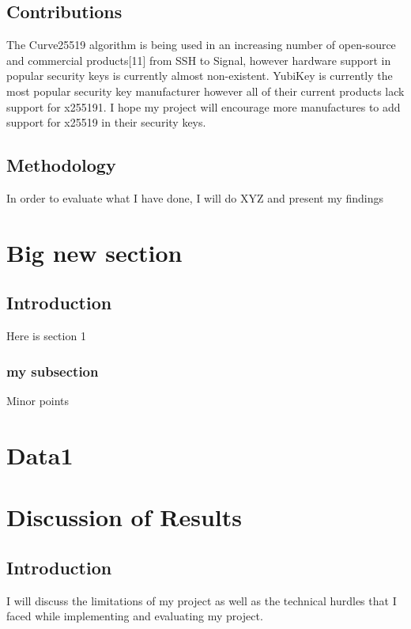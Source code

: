\documentclass [11pt, proquest] {uwthesis}[2020/02/24]
\begin{document}
\section {Contributions}
The Curve25519 algorithm is being used in an increasing number of open-source and commercial products[11] from SSH to Signal, however hardware support in popular 
security keys is currently almost non-existent. YubiKey is currently the most popular security key manufacturer however all of their current products 
lack support for x255191. I hope my project will encourage more manufactures to add support for x25519 in their security keys.


\section {Methodology}
In order to evaluate what I have done, I will do XYZ and present my findings

\chapter {Big new section}

\section {Introduction}
Here is section 1
\subsection {my subsection}
Minor points



\chapter {Data1}

\chapter {Discussion of Results}
\section {Introduction}
I will discuss the limitations of my project as well as the technical hurdles that I faced while implementing and evaluating my project.
\end{document}
